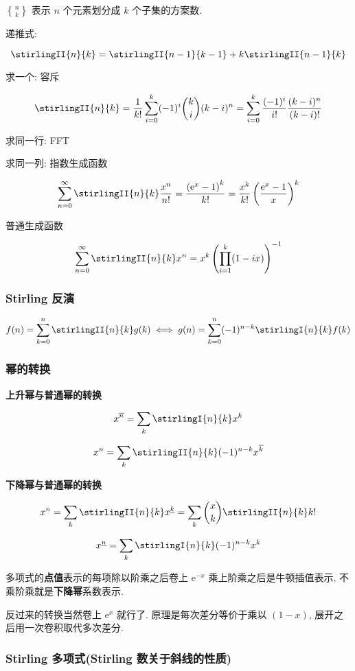 \(n\brace k\) 表示 \(n\) 个元素划分成 \(k\) 个子集的方案数.

递推式:

\[
    \stirlingII{n}{k} = \stirlingII{n-1}{k-1} + k\stirlingII{n-1}{k}
\]

求一个: 容斥

\[
    \stirlingII{n}{k} = \frac{1}{k!} \sum_{i = 0}^k (-1)^i \binom{k}{i} (k - i)^n = \sum_{i = 0}^k \frac{(-1)^i}{i!} \frac{(k - i)^n}{(k - i)!}
\]

求同一行: FFT

求同一列: 指数生成函数

\[
    \sum_{n = 0}^\infty \stirlingII{n}{k} \frac{x^n}{n!} = \frac{\left(\mathrm{e}^x - 1\right)^k}{k!} = \frac{x^k}{k!} \left( \frac{\mathrm{e}^x - 1}{x} \right)^k
\]

普通生成函数

\[
    \sum_{n = 0}^\infty \stirlingII{n}{k} x^n = x^k \left(\prod_{i = 1}^k (1 - i x)\right)^{-1}
\]

\subsubsection{Stirling 反演}

\[
    f(n) = \sum_{k = 0}^n \stirlingII{n}{k} g(k) \iff g(n) = \sum_{k = 0}^n (-1)^{n - k} \stirlingI{n}{k} f(k)
\]

\subsubsection{幂的转换}

\textbf{上升幂与普通幂的转换}

\[
    x^{\overline{n}}=\sum_{k} \stirlingI{n}{k} x^k
\]

\[
    x^n=\sum_{k} \stirlingII{n}{k} (-1)^{n-k} x^{\overline{k}}
\]

\textbf{下降幂与普通幂的转换}

\[
    x^n=\sum_{k} \stirlingII{n}{k} x^{\underline{k}} = \sum_{k} \binom{x}{k} \stirlingII{n}{k} k!
\]

\[
    x^{\underline{n}}=\sum_{k} \stirlingI{n}{k} (-1)^{n-k} x^k
\]

多项式的\textbf{点值}表示的每项除以阶乘之后卷上 \(\mathrm{e}^{-x}\) 乘上阶乘之后是牛顿插值表示, 不乘阶乘就是\textbf{下降幂}系数表示.

反过来的转换当然卷上 \(\mathrm{e}^x\) 就行了. 原理是每次差分等价于乘以 \((1 - x)\), 展开之后用一次卷积取代多次差分.

\subsubsection{Stirling 多项式(Stirling 数关于斜线的性质)}

